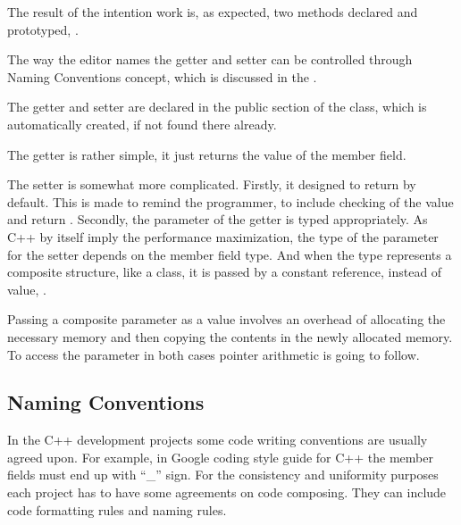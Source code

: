 
The result of the intention work is, as expected, two methods declared and prototyped, .


The way the editor names the getter and setter can be controlled through Naming Conventions concept, which
is discussed in the .

The getter and setter are declared in the public section of the class, which is automatically created, if
not found there already.

The getter is rather simple, it just returns the value of the member field.

The setter is somewhat more complicated. Firstly, it designed to return  by default. This is made
to remind the programmer, to include checking of the value and return . Secondly, the parameter of the
getter is typed appropriately. As C++ by itself imply the performance maximization, the type
of the parameter for the setter depends on the member field type. And when the type represents a composite
structure, like a class, it is passed by a constant reference, instead of value, .


Passing a composite parameter as a value involves an overhead of allocating the necessary memory and 
then copying the contents in the newly allocated memory. To access the parameter in both cases pointer
arithmetic is going to follow.



\subsection{Naming Conventions}
\label{section:namingconventions}

In the C++ development projects some code writing conventions are usually agreed upon. For example, 
in Google coding style guide for C++ \cite{googlecppstyle} the member fields must end up with ``\_'' sign.
For the consistency and uniformity purposes each project has to have some agreements on code  composing.
They can include code formatting rules and naming rules. 

